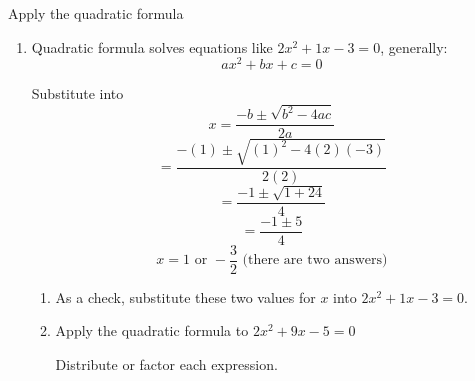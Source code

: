 \documentclass[12pt, twoside]{article}
\begin{document}
Apply the quadratic formula
\begin{enumerate}
  \subsubsection*{Factoring Fridays}

\item Quadratic formula solves equations like $2x^2+1x-3=0$, generally:
\[ax^2+bx+c=0\]

Substitute into
\[x=\frac{-b \pm \sqrt{b^2-4ac}}{2a}\] \vspace{0.5cm}
\[= \frac{-(1) \pm \sqrt{(1)^2-4(2)(-3)}}{2(2)}\] \vspace{0.5cm}
\[=\frac{-1 \pm \sqrt{1+24}}{4}\] \vspace{0.5cm}
\[=\frac{-1 \pm 5}{4}\] \vspace{0.5cm}
\[x=1 \text{ or } -\frac{3}{2} \text{ (there are two answers)}\] \vspace{0.5cm}

\begin{enumerate}
\item As a check, substitute these two values for $x$ into $2x^2+1x-3=0$.
\vspace{2.5cm}
\item Apply the quadratic formula to $2x^2+9x-5=0$

\newpage
Distribute or factor each expression.


\end{enumerate}
\end{enumerate}
\end{document}
